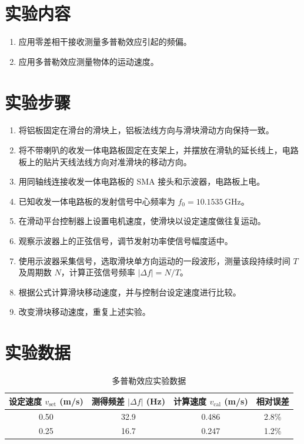 \documentclass{../ElectromagneticFieldTemplate}
\begin{document}
\section{实验内容}

\begin{enumerate}
    \item 应用零差相干接收测量多普勒效应引起的频偏。
    \item 应用多普勒效应测量物体的运动速度。
\end{enumerate}

\section{实验步骤}

\begin{enumerate}
    \item 将铝板固定在滑台的滑块上，铝板法线方向与滑块滑动方向保持一致。
    \item 将不带喇叭的收发一体电路板固定在支架上，并摆放在滑轨的延长线上，电路板上的贴片天线法线方向对准滑块的移动方向。
    \item 用同轴线连接收发一体电路板的 SMA 接头和示波器，电路板上电。
    \item 已知收发一体电路板的发射信号中心频率为 \(f_0 = 10.1535\,\text{GHz}\)。
    \item 在滑动平台控制器上设置电机速度，使滑块以设定速度做往复运动。
    \item 观察示波器上的正弦信号，调节发射功率使信号幅度适中。
    \item 使用示波器采集信号，选取滑块单方向运动的一段波形，测量该段持续时间 \(T\) 及周期数 \(N\)，计算正弦信号频率 \(|\Delta f| = N/T\)。
    \item 根据公式计算滑块移动速度，并与控制台设定速度进行比较。
    \item 改变滑块移动速度，重复上述实验。
\end{enumerate}

\section{实验数据}

\begin{table}[H]
    \centering
    \caption{多普勒效应实验数据}
    \renewcommand{\arraystretch}{1.3}
    \begin{tabular}{|c|c|c|c|}
        \hline
        设定速度 \(v_{\text{set}}\) (m/s) & 测得频差 \(|\Delta f|\) (Hz) & 计算速度 \(v_{\text{cal}}\) (m/s) & 相对误差 \\
        \hline
        0.50 & 32.9 & 0.486 & 2.8\% \\
        \hline
        0.25 & 16.7 & 0.247 & 1.2\% \\
        \hline
    \end{tabular}
\end{table}
\end{document}
